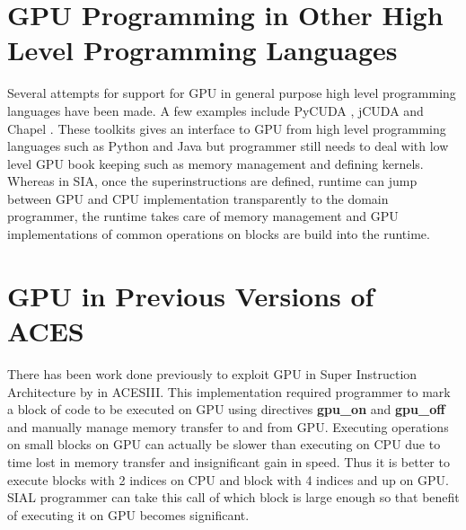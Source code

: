 \section{GPU Programming in Other High Level Programming Languages}

Several attempts for support for GPU in general purpose high level programming
languages have been made. A few examples include PyCUDA \cite{pycuda2011}, jCUDA
\cite{jcuda2009} and Chapel \cite{chapelgpu}. These toolkits gives an interface
to GPU from high level programming languages such as Python and Java but
programmer still needs to deal with low level GPU book keeping such as memory
management and defining kernels. Whereas in SIA, once the superinstructions are
defined, runtime can jump between GPU and CPU implementation transparently to
the domain programmer, the runtime takes care of memory management and GPU
implementations of common operations on blocks are build into the runtime.

\section{GPU in Previous Versions of ACES}

There has been work done previously to exploit GPU in Super Instruction
Architecture by \cite{jindal2016gpusial} in ACESIII. This implementation
required programmer to mark a block of code to be executed on GPU using
directives \textbf{gpu\_on} and \textbf{gpu\_off} and manually manage memory
transfer to and from GPU. Executing operations on small blocks on GPU can
actually be slower than executing on CPU due to time lost in memory transfer and
insignificant gain in speed. Thus it is better to execute blocks with 2 indices
on CPU and block with 4 indices and up on GPU. SIAL programmer can take this
call of which block is large enough so that benefit of executing it on GPU
becomes significant.